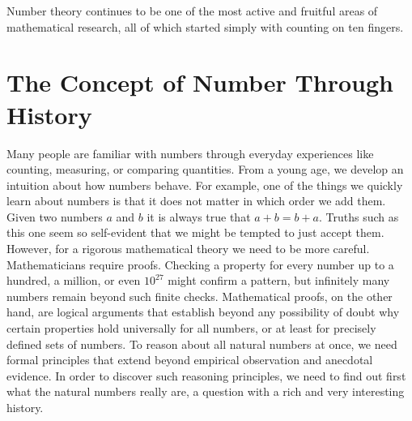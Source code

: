 Number theory continues to be one of the most active and fruitful areas of mathematical research, all of which started simply with counting on ten fingers.

\section{The Concept of Number Through History}
\label{sec:concept-of-number}

Many people are familiar with numbers through everyday experiences like counting, measuring, or comparing quantities. From a young age, we develop an intuition about how numbers behave. For example, one of the things we quickly learn about numbers is that it does not matter in which order we add them. Given two numbers $a$ and $b$ it is always true that $a+b=b+a$. Truths such as this one seem so self-evident that we might be tempted to just accept them. However, for a rigorous mathematical theory we need to be more careful. Mathematicians require proofs. Checking a property for every number up to a hundred, a million, or even $10^{27}$ might confirm a pattern, but infinitely many numbers remain beyond such finite checks. Mathematical proofs, on the other hand, are logical arguments that establish beyond any possibility of doubt why certain properties hold universally for all numbers, or at least for precisely defined sets of numbers. To reason about all natural numbers at once, we need formal principles that extend beyond empirical observation and anecdotal evidence. In order to discover such reasoning principles, we need to find out first what the natural numbers really are, a question with a rich and very interesting history.


